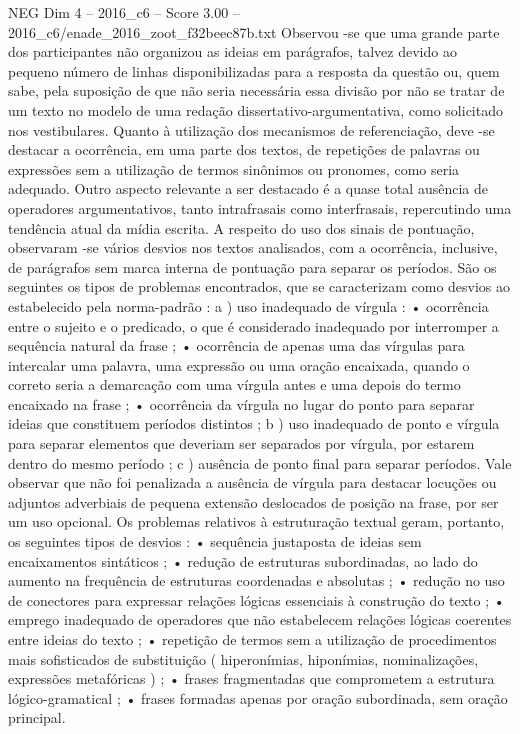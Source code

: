 \begin{textsample}{NEG Dim 4 – 2016\_c6 – Score 3.00 – 2016\_c6/enade\_2016\_zoot\_f32beec87b.txt}
Observou -se que uma grande parte dos participantes não organizou as ideias em parágrafos, talvez devido ao pequeno número de linhas disponibilizadas para a resposta da questão ou, quem sabe, pela suposição de que não seria necessária essa divisão por não se tratar de um texto no modelo de uma redação dissertativo-argumentativa, como solicitado nos vestibulares.
Quanto à utilização dos mecanismos de referenciação, deve -se destacar a ocorrência, em uma parte dos textos, de repetições de palavras ou expressões sem a utilização de termos sinônimos ou pronomes, como seria adequado.
Outro aspecto relevante a ser destacado é a quase total ausência de operadores argumentativos, tanto intrafrasais como interfrasais, repercutindo uma tendência atual da mídia escrita.
A respeito do uso dos sinais de pontuação, observaram -se vários desvios nos textos analisados, com a ocorrência, inclusive, de parágrafos sem marca interna de pontuação para separar os períodos.
São os seguintes os tipos de problemas encontrados, que se caracterizam como desvios ao estabelecido pela norma-padrão : a ) uso inadequado de vírgula : • ocorrência entre o sujeito e o predicado, o que é considerado inadequado por interromper a sequência natural da frase ; • ocorrência de apenas uma das vírgulas para intercalar uma palavra, uma expressão ou uma oração encaixada, quando o correto seria a demarcação com uma vírgula antes e uma depois do termo encaixado na frase ; • ocorrência da vírgula no lugar do ponto para separar ideias que constituem períodos distintos ; b ) uso inadequado de ponto e vírgula para separar elementos que deveriam ser separados por vírgula, por estarem dentro do mesmo período ; c ) ausência de ponto final para separar períodos.
Vale observar que não foi penalizada a ausência de vírgula para destacar locuções ou adjuntos adverbiais de pequena extensão deslocados de posição na frase, por ser um uso opcional.
Os problemas relativos à estruturação textual geram, portanto, os seguintes tipos de desvios : • sequência justaposta de ideias sem encaixamentos sintáticos ; • redução de estruturas subordinadas, ao lado do aumento na frequência de estruturas coordenadas e absolutas ; • redução no uso de conectores para expressar relações lógicas essenciais à construção do texto ; • emprego inadequado de operadores que não estabelecem relações lógicas coerentes entre ideias do texto ; • repetição de termos sem a utilização de procedimentos mais sofisticados de substituição ( hiperonímias, hiponímias, nominalizações, expressões metafóricas ) ; • frases fragmentadas que comprometem a estrutura lógico-gramatical ; • frases formadas apenas por oração subordinada, sem oração principal.

\end{textsample}
